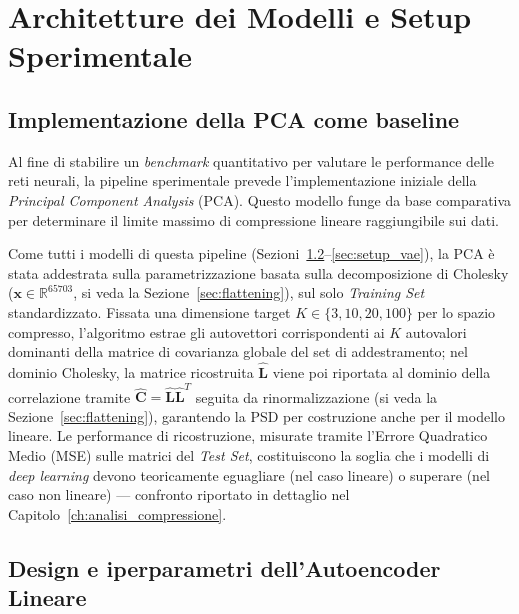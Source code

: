 \chapter{Architetture dei Modelli e Setup Sperimentale}
\label{ch:architetture}

\section{Implementazione della PCA come baseline}
\label{sec:setup_pca}

Al fine di stabilire un \emph{benchmark} quantitativo per valutare le performance delle reti neurali, la pipeline sperimentale prevede l'implementazione iniziale della \emph{Principal Component Analysis} (PCA). Questo modello funge da base comparativa per determinare il limite massimo di compressione lineare raggiungibile sui dati.

Come tutti i modelli di questa pipeline (Sezioni~\ref{sec:setup_linear_ae}--\ref{sec:setup_vae}), la PCA è stata addestrata sulla parametrizzazione basata sulla decomposizione di Cholesky ($\mathbf{x} \in \mathbb{R}^{65703}$, si veda la Sezione~\ref{sec:flattening}), sul solo \emph{Training Set} standardizzato. Fissata una dimensione target $K \in \{3, 10, 20, 100\}$ per lo spazio compresso, l'algoritmo estrae gli autovettori corrispondenti ai $K$ autovalori dominanti della matrice di covarianza globale del set di addestramento; nel dominio Cholesky, la matrice ricostruita $\hat{\mathbf{L}}$ viene poi riportata al dominio della correlazione tramite $\hat{\mathbf{C}} = \hat{\mathbf{L}}\hat{\mathbf{L}}^T$ seguita da rinormalizzazione (si veda la Sezione~\ref{sec:flattening}), garantendo la PSD per costruzione anche per il modello lineare. Le performance di ricostruzione, misurate tramite l'Errore Quadratico Medio (MSE) sulle matrici del \emph{Test Set}, costituiscono la soglia che i modelli di \emph{deep learning} devono teoricamente eguagliare (nel caso lineare) o superare (nel caso non lineare) --- confronto riportato in dettaglio nel Capitolo~\ref{ch:analisi_compressione}.

\section{Design e iperparametri dell'Autoencoder Lineare}
\label{sec:setup_linear_ae}

